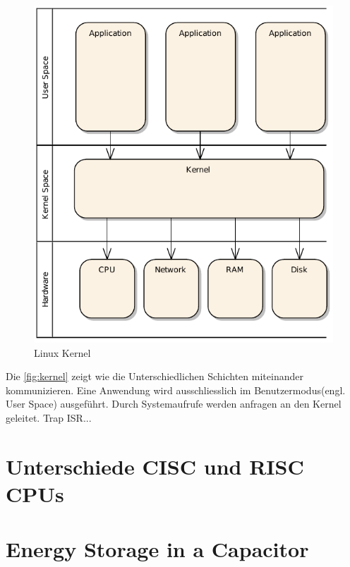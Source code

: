 \begin{figure}
\centering
\includegraphics[scale=0.8]{images/kernel.pdf}
\caption{Linux Kernel}
\label{fig:kernel}
\end{figure}

Die \autoref{fig:kernel} zeigt wie die Unterschiedlichen Schichten miteinander kommunizieren. Eine Anwendung wird ausschliesslich im Benutzermodus(engl. User Space) ausgeführt. Durch Systemaufrufe werden anfragen an den Kernel geleitet. Trap ISR... 




\section{Unterschiede CISC und RISC CPUs}



\section{Energy Storage in a Capacitor}


